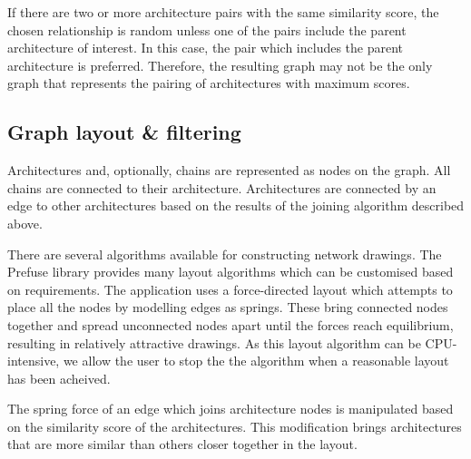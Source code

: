 If there are two or more architecture pairs with the same similarity score, the chosen relationship is random unless one of the pairs include the parent architecture of interest. In this case, the pair which includes the parent architecture is preferred. Therefore, the resulting graph may not be the only graph that represents the pairing of architectures with maximum scores. 

\subsection{Graph layout \& filtering}
Architectures and, optionally, chains are represented as nodes on the graph. All chains are connected to their architecture. Architectures are connected by an edge to other architectures based on the results of the joining algorithm described above.  

There are several algorithms available for constructing network drawings. The Prefuse library provides many layout algorithms which can be customised based on requirements. The application uses a force-directed layout \cite{force} which attempts to place all the nodes by modelling edges as springs. These bring connected nodes together and spread unconnected nodes apart until the forces reach equilibrium, resulting in relatively attractive drawings. As this layout algorithm can be CPU-intensive, we allow the user to stop the the algorithm when a reasonable layout has been acheived.

The spring force of an edge which joins architecture nodes is manipulated based on the similarity score of the architectures. This modification brings architectures that are more similar than others closer together in the layout. 

